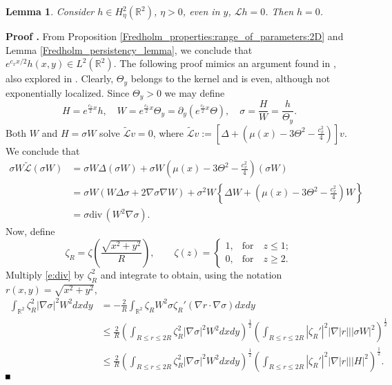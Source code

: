 \documentclass[10pt]{article}
\newtheorem{Lemma}{Lemma}[section]
\newenvironment{Proof}[1][\unskip]%
 {\begin{trivlist} \item[]{\bf Proof #1. }}%
 {\hspace*{\fill}$\rule{.4\baselineskip}{.4\baselineskip}$\end{trivlist}}
\newcommand{\R}{\mathbb{R}}
\renewcommand{\leq}{\leqslant}
\renewcommand{\geq}{\geqslant}
\begin{document}
\begin{Lemma}\label{Lemma:almost_trivial_kernel} Consider $h\in  H^2_\eta(\R^2)$, $\eta>0$, even in $y$, $\mathscr{L}h=0$. Then $h=0$. 
\end{Lemma}
\begin{Proof} From Proposition \ref{Fredholm_properties:range_of_parameters:2D} and Lemma  \ref{Fredholm_persistency_lemma}, we conclude that $\displaystyle{e^{c_x x/2}h(x,y) \in L^2(\R^2)}$.  The following  proof mimics an argument found in \cite[\S 4]{berestycki1997further}, also explored in \cite{Kowalczyk}.  Clearly, $\Theta_y$ belongs to the kernel and is even, although not exponentially localized. Since $\Theta_y>0$ we may define 
\[
H = e^{\frac{c_x}{2}x}h, \quad W = e^{\frac{c_x}{2}x}\Theta_y = \partial_y( e^{\frac{c_x}{2}x}\Theta), \quad \sigma =\frac{H}{W} = \frac{h}{\Theta_y}. 
\]
Both $W$ and  $H = \sigma W$ solve $\tilde{\mathscr{L}}v=0$, where
%
$\tilde{\mathscr{L}}v := \left[\Delta + \left(\mu(x) - 3\Theta^2 - \frac{c_x^2}{4}\right)\right]v.$ We conclude that 
\begin{align}
\sigma W\tilde{\mathscr{L}}(\sigma W) &= \sigma W\Delta(\sigma W) + \sigma W\left(\mu(x) - 3\Theta^2 - \frac{c_x^2}{4}\right)(\sigma W) \nonumber\\
& = \sigma W\left(W \Delta \sigma + 2 \nabla \sigma \nabla W  \right) + \sigma^2 W \left\{\Delta W + \left(\mu(x) - 3\Theta^2 - \frac{c_x^2}{4}\right)W\right\}\nonumber \\
& = \sigma \mathrm{div}\,(W^2 \nabla\sigma).\label{e:div}
\end{align}
%
Now, define 
\[
\zeta_R = \zeta\left(\frac{\sqrt{x^2 + y^2}}{R}\right),\qquad   \zeta(z) = \left\{\begin{array}{cc}
      1, & \mbox{for} \quad z \leq 1;\\
      0, & \mbox{for} \quad z\geq 2.
      \end{array} \right.
\]
Multiply \eqref{e:div} by $\zeta_R^2$ and integrate to obtain, using the notation $r(x,y)=\sqrt{x^2+y^2}$,
\begin{align*}
\int_{\mathbb{R}^2} \zeta_R^2|\nabla \sigma|^2 W^2 dxdy &= -\frac{2}{R}\int_{\mathbb{R}^2}\zeta_R W^2 \sigma\zeta_R'(\nabla r\cdot \nabla \sigma)dx dy  \nonumber \\
&\leq \frac{2}{R}\left( \int_{R \leq r \leq 2R} \zeta_R^2|\nabla \sigma|^2 W^2 dxdy\right)^{\frac{1}{2}}\left(\int_{R \leq r \leq 2R}|\zeta_R'|^2 |\nabla|r|||\sigma W|^2 \right)^{\frac{1}{2}} \nonumber \\
&\leq \frac{2}{R}\left( \int_{R \leq r \leq 2R} \zeta_R^2|\nabla \sigma|^2 W^2 dxdy\right)^{\frac{1}{2}}\left(\int_{R \leq r \leq 2R}|\zeta_R'|^2 |\nabla|r|||H|^2 \right)^{\frac{1}{2}}.

\end{align*}
\end{Proof}
\end{document}
